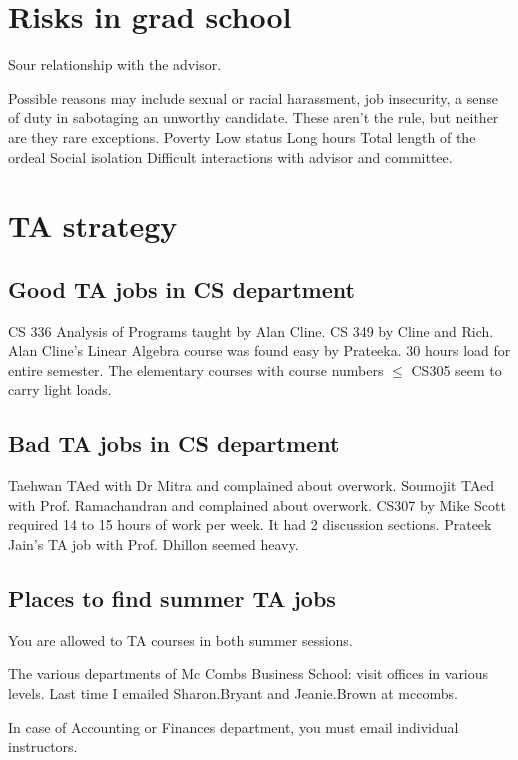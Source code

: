 \documentclass[oneside, article]{memoir}
\begin{document}
\section{Risks in grad school}
\subitem Sour relationship with the advisor.

\subsubitem Possible reasons may include sexual or racial harassment, job insecurity, a sense of duty in sabotaging an unworthy candidate. These aren't the rule, but neither are they rare exceptions.
\subitem Poverty
\subitem Low status
\subitem Long hours
\subitem Total length of the ordeal
\subitem Social isolation
\subitem Difficult interactions with advisor and committee.


\section{TA strategy}

\subsection{Good TA jobs in CS department}
\subitem CS 336 Analysis of Programs taught by Alan Cline.
\subitem CS 349 by Cline and Rich.
\subitem Alan Cline's Linear Algebra course was found easy by Prateeka. 30 hours load for entire semester.
\subitem The elementary courses with course numbers $\leq$ CS305 seem to carry light loads.

\subsection{Bad TA jobs in CS department}
\subitem Taehwan TAed with Dr Mitra and complained about overwork.
\subitem Soumojit TAed with Prof. Ramachandran and complained about overwork.
\subitem CS307 by Mike Scott required 14 to 15 hours of work per week. It had 2 discussion sections.
\subitem Prateek Jain's TA job with Prof. Dhillon seemed heavy.

\subsection{Places to find summer TA jobs}
\subitem You are allowed to TA courses in both summer sessions.

\subitem The various departments of Mc Combs Business School: visit offices in various levels. Last time I emailed Sharon.Bryant and Jeanie.Brown at mccombs.

\subsubitem In case of Accounting or Finances department, you must email individual instructors.
\end{document}
